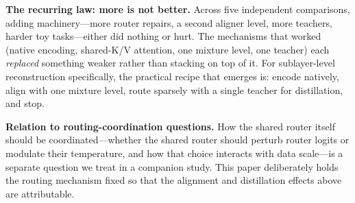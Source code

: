 \documentclass[10pt,twoside]{article}
\theoremstyle{definition}
\begin{document}
\textbf{The recurring law: more is not better.} Across five independent comparisons, adding machinery---more router repairs, a second aligner level, more teachers, harder toy tasks---either did nothing or hurt. The mechanisms that worked (native encoding, shared-K/V attention, one mixture level, one teacher) each \emph{replaced} something weaker rather than stacking on top of it. For sublayer-level reconstruction specifically, the practical recipe that emerges is: encode natively, align with one mixture level, route sparsely with a single teacher for distillation, and stop.

\textbf{Relation to routing-coordination questions.} How the shared router itself should be coordinated---whether the shared router should perturb router logits or modulate their temperature, and how that choice interacts with data scale---is a separate question we treat in a companion study. This paper deliberately holds the routing mechanism fixed so that the alignment and distillation effects above are attributable.
\end{document}
